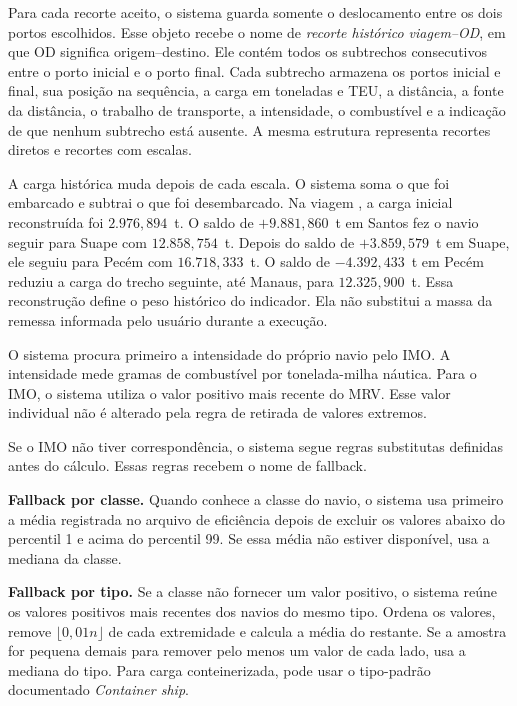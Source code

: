 Para cada recorte aceito, o sistema guarda somente o deslocamento entre os dois portos escolhidos. Esse objeto recebe o nome de \emph{recorte histórico viagem--OD}, em que OD significa origem--destino. Ele contém todos os subtrechos consecutivos entre o porto inicial e o porto final. Cada subtrecho armazena os portos inicial e final, sua posição na sequência, a carga em toneladas e TEU, a distância, a fonte da distância, o trabalho de transporte, a intensidade, o combustível e a indicação de que nenhum subtrecho está ausente. A mesma estrutura representa recortes diretos e recortes com escalas.

A carga histórica muda depois de cada escala. O sistema soma o que foi embarcado e subtrai o que foi desembarcado. Na viagem , a carga inicial reconstruída foi \(2.976{,}894\)~t. O saldo de \(+9.881{,}860\)~t em Santos fez o navio seguir para Suape com \(12.858{,}754\)~t. Depois do saldo de \(+3.859{,}579\)~t em Suape, ele seguiu para Pecém com \(16.718{,}333\)~t. O saldo de \(-4.392{,}433\)~t em Pecém reduziu a carga do trecho seguinte, até Manaus, para \(12.325{,}900\)~t. Essa reconstrução define o peso histórico do indicador. Ela não substitui a massa da remessa informada pelo usuário durante a execução.

O sistema procura primeiro a intensidade do próprio navio pelo IMO. A intensidade mede gramas de combustível por tonelada-milha náutica. Para o IMO, o sistema utiliza o valor positivo mais recente do MRV. Esse valor individual não é alterado pela regra de retirada de valores extremos.

Se o IMO não tiver correspondência, o sistema segue regras substitutas definidas antes do cálculo. Essas regras recebem o nome de fallback.

\textbf{Fallback por classe.} Quando conhece a classe do navio, o sistema usa primeiro a média registrada no arquivo de eficiência depois de excluir os valores abaixo do percentil 1 e acima do percentil 99. Se essa média não estiver disponível, usa a mediana da classe.

\textbf{Fallback por tipo.} Se a classe não fornecer um valor positivo, o sistema reúne os valores positivos mais recentes dos navios do mesmo tipo. Ordena os valores, remove \(\lfloor0{,}01n\rfloor\) de cada extremidade e calcula a média do restante. Se a amostra for pequena demais para remover pelo menos um valor de cada lado, usa a mediana do tipo. Para carga conteinerizada, pode usar o tipo-padrão documentado \emph{Container ship}.

